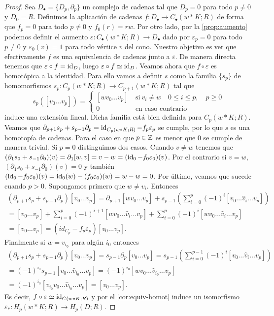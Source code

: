 \begin{proof}
	Sea $D_{\bullet} = \{D_p, \partial_p\}$ un complejo de cadenas tal que $D_p = 0$ para todo $p \neq 0$ y $D_0 = R$. Definimos la aplicación de cadenas $f: D_{\bullet} \to C_{\bullet}(w \ast K;R)$ de forma que $f_p = 0$ para todo $p \neq 0$ y $f_0(r)=rw$. Por otro lado, por la \autoref{prop:aumento} podemos definir el aumento $\varepsilon: C_{\bullet}(w \ast K;R) \to D_{\bullet}$ dado por $\varepsilon_p=0$ para todo $p \neq 0$ y $\varepsilon_0(v) = 1$ para todo vértice $v$ del cono. Nuestro objetivo es ver que efectivamente $f$ es una equivalencia de cadenas junto a $\varepsilon$. De manera directa tenemos que $\varepsilon \circ f = \operatorname{id}_D$, luego $\varepsilon \circ f \simeq \operatorname{id}_D$. Veamos ahora que $f \circ \varepsilon$ es homotópica a la identidad. Para ello vamos a definir $s$ como la familia $\{s_p\}$ de homomorfismos $s_p: C_p(w \ast K;R) \to C_{p+1}(w \ast K;R)$ tal que
	\[
	s_p([v_0\dots v_p]) =
	\begin{cases}
		[wv_0 \dots v_p] \ &\text{si} \ v_i \neq w \quad 0 \leq i \leq p,\quad p \geq 0 \\
		0 \ & \text{en caso contrario}
	\end{cases}
	\]
	induce una extensión lineal. Dicha familia está bien definida para $C_p(w \ast K;R)$. Veamos que $\partial_{p+1}s_p + s_{p-1}\partial_p = \operatorname{id}_{C_p(w \ast K;R)} - f_p\varepsilon_p$ se cumple, por lo que $s$ es una homotopía de cadenas. Para el caso en que $p \in \mathbb{Z}$ es menor que $0$ se cumple de manera trivial. Si $p = 0$ distinguimos dos casos. Cuando $v \neq w$ tenemos que $(\partial_1s_0+s_{-1}\partial_0)(v) = \partial_1[w,v] = v-w = (\operatorname{id}_0 - f_0\varepsilon_0)(v)$. Por el contrario si $v = w$, $(\partial_1s_0+s_{-1}\partial_0)(v) = 0$ y también $(\operatorname{id}_0 - f_0\varepsilon_0)(v) = \operatorname{id}_0(w) - (f_0\varepsilon_0)(w) = w - w = 0$. Por último, veamos que sucede cuando $p > 0$. Supongamos primero que $w \neq v_i$. Entonces
	\begin{gather*}
	(\partial_{p+1}s_{p} + s_{p-1} \partial_p)[v_0 \dots v_p] =\partial_{p+1}[wv_{0}\dots v_{p}]+s_{p-1}\left(\sum_{i=0}^{p}(-1)^{i}[v_{0}\dots\hat{v}_{i}\dots v_{p}]\right) \\
	=[v_{0}\dots v_{p}]+\sum_{i=0}^{p}(-1)^{i+1}[wv_{0}\dots\hat{v}_{i}\dots v_{p}]+\sum_{i=0}^{p}(-1)^{i}[wv_{0}\dots\hat{v}_{i}\dots v_p] \\
	=[v_{0}\dots v_{p}]=(id_{C_{p}}-f_{p}\varepsilon_{p})[v_{0}\dots v_{p}].
	\end{gather*}
	Finalmente si $w = v_{i_0}$ para algún $i_0$ entonces
	\begin{gather*}
		(\partial_{p+1}s_{p}+s_{p-1}\partial_{p})[v _{0}\dots v _{p}]=s_{p-1}\partial_{p}[v _{0}\dots v _{p}] =s_{p-1} \left( \sum_{i=0}^{p-1} (-1)^i [v _0\dots \hat{v}_i \dots v _{p}] \right) \\
		=(-1)^{i_0} s_{p-1}[v _0\dots \hat{v}_{i_0} \dots v _p] =(-1)^{i_0} [wv _0\dots \hat{v}_{i_0} \dots v _p] \\ =(-1)^{i_0} [v_{i_0}v _0\dots \hat{v}_{i_0} \dots v _p]
		=[v _0\dots v _p].
	\end{gather*}
	Es decir, $f \circ \varepsilon \simeq \operatorname{id}_{C(w \ast K;R)}$ y por el \autoref{cor:equiv-homot} induce un isomorfismo $\varepsilon_*: H_p(w \ast K;R) \to H_p(D;R)$.
	

\end{proof}

